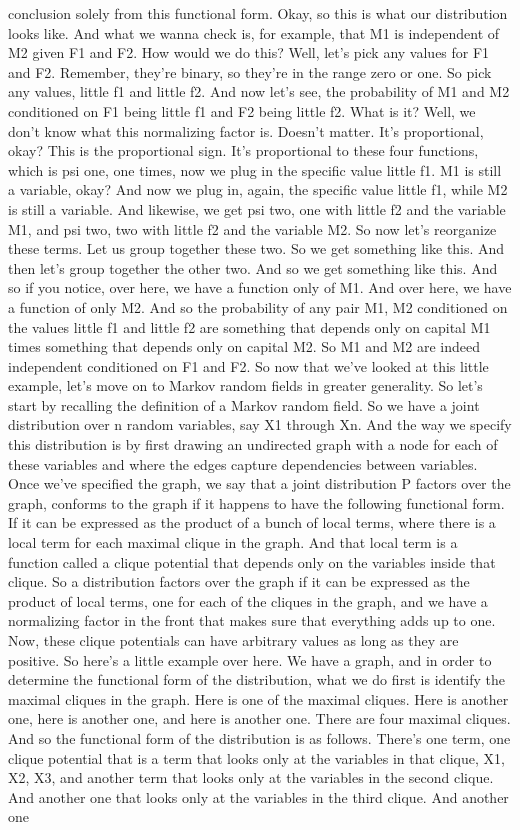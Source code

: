 \documentclass{article}
\begin{document}
\begin{flushleft}
conclusion solely from this functional form. Okay, so this is what our distribution looks like. And what we wanna check is, for example, that M1 is independent of M2 given F1 and F2. How would we do this? Well, let's pick any values for F1 and F2. Remember, they're binary, so they're in the range zero or one. So pick any values, little f1 and little f2. And now let's see, the probability of M1 and M2 conditioned on F1 being little f1 and F2 being little f2. What is it? Well, we don't know what this normalizing factor is. Doesn't matter. It's proportional, okay? This is the proportional sign. It's proportional to these four functions, which is psi one, one times, now we plug in the specific value little f1. M1 is still a variable, okay? And now we plug in, again, the specific value little f1, while M2 is still a variable. And likewise, we get psi two, one with little f2 and the variable M1, and psi two, two with little f2 and the variable M2. So now let's reorganize these terms. Let us group together these two. So we get something like this. And then let's group together the other two. And so we get something like this. And so if you notice, over here, we have a function only of M1. And over here, we have a function of only M2. And so the probability of any pair M1, M2 conditioned on the values little f1 and little f2 are something that depends only on capital M1 times something that depends only on capital M2. So M1 and M2 are indeed independent conditioned on F1 and F2. So now that we've looked at this little example, let's move on to Markov random fields in greater generality. So let's start by recalling the definition of a Markov random field. So we have a joint distribution over n random variables, say X1 through Xn. And the way we specify this distribution is by first drawing an undirected graph with a node for each of these variables and where the edges capture dependencies between variables. Once we've specified the graph, we say that a joint distribution P factors over the graph, conforms to the graph if it happens to have the following functional form. If it can be expressed as the product of a bunch of local terms, where there is a local term for each maximal clique in the graph. And that local term is a function called a clique potential that depends only on the variables inside that clique. So a distribution factors over the graph if it can be expressed as the product of local terms, one for each of the cliques in the graph, and we have a normalizing factor in the front that makes sure that everything adds up to one. Now, these clique potentials can have arbitrary values as long as they are positive. So here's a little example over here. We have a graph, and in order to determine the functional form of the distribution, what we do first is identify the maximal cliques in the graph. Here is one of the maximal cliques. Here is another one, here is another one, and here is another one. There are four maximal cliques. And so the functional form of the distribution is as follows. There's one term, one clique potential that is a term that looks only at the variables in that clique, X1, X2, X3, and another term that looks only at the variables in the second clique. And another one that looks only at the variables in the third clique. And another one 
\end{flushleft}
\end{document}
